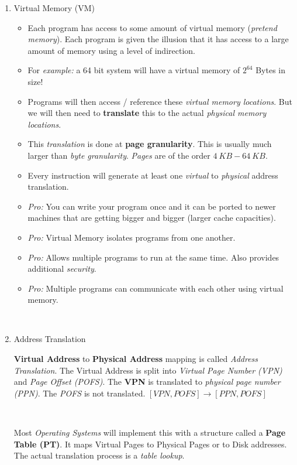 \documentclass[12pt]{article}
\newenvironment{QandA}{\begin{enumerate}[label=\bfseries\arabic*.]\bfseries}
                      {\end{enumerate}}
\newenvironment{answered}{\par\quad\normalfont}{}
\begin{document}
\begin{QandA}
\item Virtual Memory (VM)
\begin{answered}
\vspace{-0.85cm}
\begin{itemize}
    \item Each program has access to some amount of virtual memory (\textit{pretend memory}). Each program is given the illusion that it has access to a large amount of memory using a level of indirection. 
    \item For \textit{example:} a 64 bit system will have a virtual memory of $2^{64}$ Bytes in size!
    \item Programs will then access / reference these \textit{virtual memory locations}. But we will then need to \textbf{translate} this to the actual \textit{physical memory locations}. 
    \item This \textit{translation} is done at \textbf{page granularity}. This is usually much larger than \textit{byte granularity}. \textit{Pages} are of the order $4\ KB-64\ KB$. 
    \item Every instruction will generate at least one \textit{virtual} to \textit{physical} address translation.
    \item \textit{Pro:} You can write your program once and it can be ported to newer machines that are getting bigger and bigger (larger cache capacities).
    \item \textit{Pro:} Virtual Memory isolates programs from one another.
    \item \textit{Pro:} Allows multiple programs to run at the same time. Also provides additional \textit{security}.
    \item \textit{Pro:} Multiple programs can communicate with each other using virtual memory.
\end{itemize}
\end{answered}

\ 

\item Address Translation
\begin{answered}
\textbf{Virtual Address} to \textbf{Physical Address} mapping is called \textit{Address Translation}. The Virtual Address is split into \textit{Virtual Page Number (VPN)} and \textit{Page Offset (POFS)}. The \textbf{VPN} is translated to \textit{physical page number (PPN)}. The \textit{POFS} is not translated. $[VPN,POFS] \rightarrow [PPN,POFS]$

\ 

Most \textit{Operating Systems} will implement this with a structure called a \textbf{Page Table (PT)}. It maps Virtual Pages to Physical Pages or to Disk addresses. The actual translation process is a \textit{table lookup}. 


\end{answered}
\end{QandA}
\end{document}
